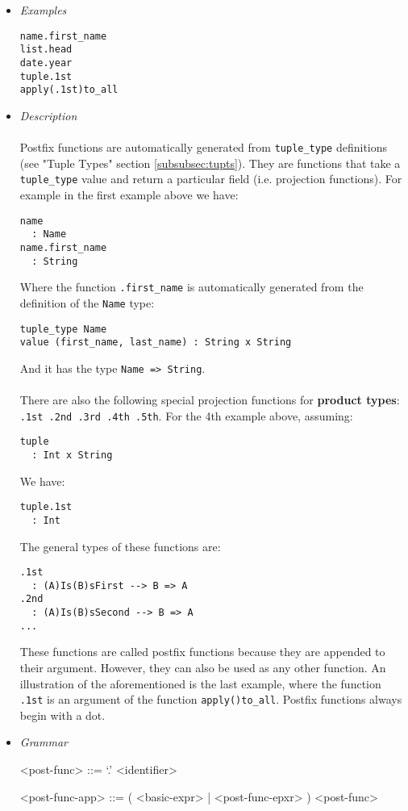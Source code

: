 \documentclass{article}
\begin{document}
\begin{itemize}

\item \textit{Examples}
\begin{verbatim}
name.first_name
list.head
date.year
tuple.1st
apply(.1st)to_all
\end{verbatim}

\item \textit{Description} \\\\
Postfix functions are automatically generated from \texttt{tuple_type}
definitions (see "Tuple Types" section \ref{subsubsec:tupts}). They are
functions that take a \texttt{tuple_type} value and return a particular field
(i.e. projection functions). For example in the first example above we have:
\begin{verbatim}
name 
  : Name
name.first_name
  : String
\end{verbatim}
Where the function \texttt{.first_name} is automatically generated from the
definition of the \texttt{Name} type:
\begin{verbatim}
tuple_type Name
value (first_name, last_name) : String x String
\end{verbatim}
And it has the type \texttt{Name => String}.
\\\\
There are also the following special projection functions for \textbf{product
types}: \texttt{.1st .2nd .3rd .4th .5th}. For the 4th example above, assuming:
\begin{verbatim}
tuple 
  : Int x String
\end{verbatim}
We have:
\begin{verbatim}
tuple.1st
  : Int
\end{verbatim}
The general types of these functions are:
\begin{verbatim}
.1st
  : (A)Is(B)sFirst --> B => A
.2nd
  : (A)Is(B)sSecond --> B => A
...
\end{verbatim}
These functions are called postfix functions because they are appended to
their argument. However, they can also be used as any other function.
An illustration of the aforementioned is the last example, where the function
\texttt{.1st} is an argument of the function \texttt{apply()to_all}.
Postfix functions always begin with a dot.


\item \textit{Grammar}
\begin{grammar}
<post-func> ::= `.' <identifier>

<post-func-app> ::= ( <basic-expr> | <post-func-epxr> ) <post-func>
\end{grammar}

\end{itemize}
\end{document}
